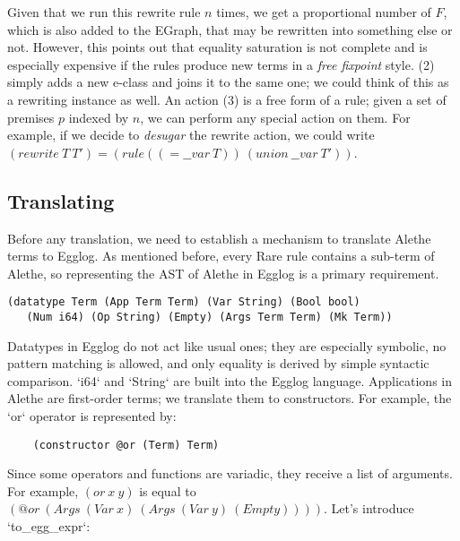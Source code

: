 \documentclass{article}
\begin{document}
Given that we run this rewrite rule $n$ times, we get a proportional number of $F$, which is also added to the EGraph, that may be rewritten into something else or not. However, this points out that equality saturation is not complete and is especially expensive if the rules produce new terms in a \emph{free fixpoint} style. (2) simply adds a new e-class and joins it to the same one; we could think of this as a rewriting instance as well. An action (3) is a free form of a rule; given a set of premises $p$ indexed by $n$, we can perform any special action on them. For example, if we decide to \emph{desugar} the rewrite action, we could write $(rewrite\:T\:T') = (rule ((= \_\_var\:T))\:(union\:\_\_var \:T'))$.

\subsection{Translating}
Before any translation, we need to establish a mechanism to translate Alethe terms to Egglog. As mentioned before, every Rare rule contains a sub-term of Alethe, so representing the AST of Alethe in Egglog is a primary requirement. 

\begin{lstlisting}
(datatype Term (App Term Term) (Var String) (Bool bool)
   (Num i64) (Op String) (Empty) (Args Term Term) (Mk Term))
\end{lstlisting}

Datatypes in Egglog do not act like usual ones; they are especially symbolic, no pattern matching is allowed, and only equality is derived by simple syntactic comparison. `i64` and `String` are built into the Egglog language. Applications in Alethe are first-order terms; we translate them to constructors. For example, the `or` operator is represented by:

\begin{lstlisting}
    (constructor @or (Term) Term)
\end{lstlisting}

Since some operators and functions are variadic, they receive a list of arguments. For example, $(or\:x\:y)$ is equal to $(@or\:(Args\:(Var\:x)\:(Args\:(Var\:y)\:(Empty))))$. Let's introduce `to\_egg\_expr`:
\end{document}
